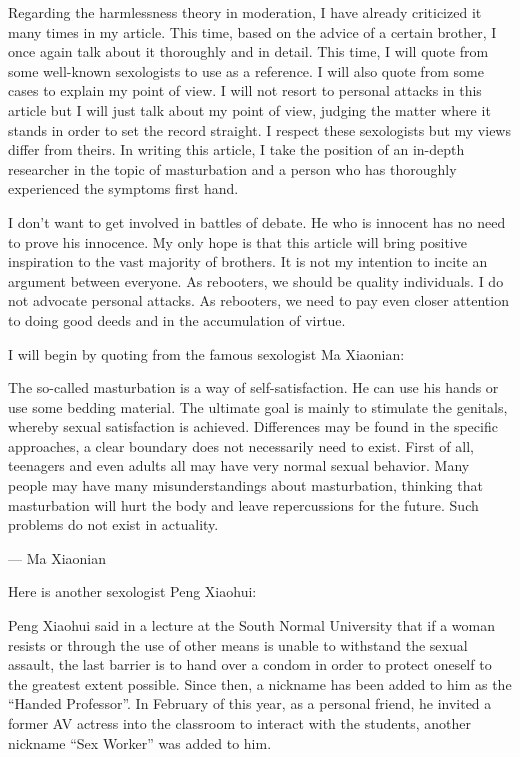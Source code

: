 \documentclass[
]{book}
\begin{document}
Regarding the harmlessness theory in moderation, I have already criticized it many times in my article. This time, based on the advice of a certain brother, I once again talk about it thoroughly and in detail. This time, I will quote from some well-known sexologists to use as a reference. I will also quote from some cases to explain my point of view. I will not resort to personal attacks in this article but I will just talk about my point of view, judging the matter where it stands in order to set the record straight. I respect these sexologists but my views differ from theirs. In writing this article, I take the position of an in-depth researcher in the topic of masturbation and a person who has thoroughly experienced the symptoms first hand.

I don't want to get involved in battles of debate. He who is innocent has no need to prove his innocence. My only hope is that this article will bring positive inspiration to the vast majority of brothers. It is not my intention to incite an argument between everyone. As rebooters, we should be quality individuals. I do not advocate personal attacks. As rebooters, we need to pay even closer attention to doing good deeds and in the accumulation of virtue.

I will begin by quoting from the famous sexologist Ma Xiaonian:

The so-called masturbation is a way of self-satisfaction. He can use his hands or use some bedding material. The ultimate goal is mainly to stimulate the genitals, whereby sexual satisfaction is achieved. Differences may be found in the specific approaches, a clear boundary does not necessarily need to exist. First of all, teenagers and even adults all may have very normal sexual behavior. Many people may have many misunderstandings about masturbation, thinking that masturbation will hurt the body and leave repercussions for the future. Such problems do not exist in actuality.

--- Ma Xiaonian

Here is another sexologist Peng Xiaohui:

Peng Xiaohui said in a lecture at the South Normal University that if a woman resists or through the use of other means is unable to withstand the sexual assault, the last barrier is to hand over a condom in order to protect oneself to the greatest extent possible. Since then, a nickname has been added to him as the ``Handed Professor''. In February of this year, as a personal friend, he invited a former AV actress into the classroom to interact with the students, another nickname ``Sex Worker'' was added to him.
\end{document}
